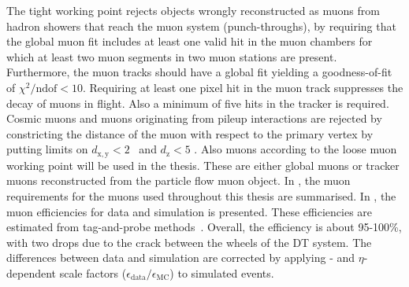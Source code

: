 The tight working point rejects objects wrongly reconstructed as muons from hadron showers that reach the muon system (punch-throughs), by requiring that the global muon fit includes at least one valid hit in the muon chambers for which at least two muon segments in two muon stations are present. Furthermore, the muon tracks should have a global fit yielding a goodness-of-fit of $\chi^2 / \mathrm{ndof} < 10$. Requiring at least one pixel hit in the muon track suppresses the decay of muons in flight. Also a minimum of five hits in the tracker is required. Cosmic muons and muons originating from pileup interactions are rejected by constricting the distance of the muon with respect to the primary vertex by putting limits on $d_{\mathrm{x,y}}< 2$ \mm\ and $d_{\mathrm{z}}<5$ \mm. Also muons according to the loose muon working point will be used in the thesis. These are either global muons or tracker muons reconstructed from the particle flow muon object. In , the muon requirements for the muons used throughout this thesis are summarised.  In , the muon efficiencies for data and simulation is presented. These efficiencies are estimated from tag-and-probe methods~\cite{CMS-DP-2017-007}.
Overall, the efficiency is about 95-100\%, with two drops due to the crack between the wheels of the DT system. The differences between data and simulation are corrected by applying \pt- and $\eta$-dependent scale factors ($\epsilon_{\mathrm{data}}/\epsilon_{\mathrm{MC}}$) to simulated events. 
